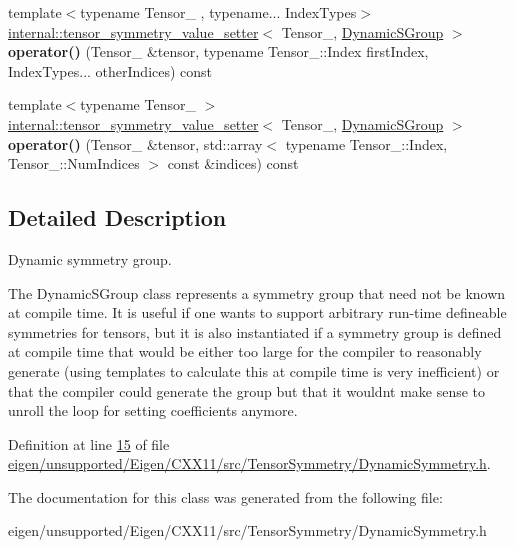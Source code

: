 \begin{DoxyCompactItemize}
\mbox{\label{class_eigen_1_1_dynamic_s_group_a0d1f3c6ef73e3661a568ce888b6cca58}} 
{\footnotesize template$<$typename Tensor\+\_\+ , typename... Index\+Types$>$ }\\\hyperlink{class_eigen_1_1internal_1_1tensor__symmetry__value__setter}{internal\+::tensor\+\_\+symmetry\+\_\+value\+\_\+setter}$<$ Tensor\+\_\+, \hyperlink{class_eigen_1_1_dynamic_s_group}{Dynamic\+S\+Group} $>$ {\bfseries operator()} (Tensor\+\_\+ \&tensor, typename Tensor\+\_\+\+::\+Index first\+Index, Index\+Types... other\+Indices) const
\item 
\mbox{\label{class_eigen_1_1_dynamic_s_group_a22aed98eb89f2775943663efec999ae6}} 
{\footnotesize template$<$typename Tensor\+\_\+ $>$ }\\\hyperlink{class_eigen_1_1internal_1_1tensor__symmetry__value__setter}{internal\+::tensor\+\_\+symmetry\+\_\+value\+\_\+setter}$<$ Tensor\+\_\+, \hyperlink{class_eigen_1_1_dynamic_s_group}{Dynamic\+S\+Group} $>$ {\bfseries operator()} (Tensor\+\_\+ \&tensor, std\+::array$<$ typename Tensor\+\_\+\+::\+Index, Tensor\+\_\+\+::\+Num\+Indices $>$ const \&indices) const
\end{DoxyCompactItemize}


\subsection{Detailed Description}
Dynamic symmetry group. 

The Dynamic\+S\+Group class represents a symmetry group that need not be known at compile time. It is useful if one wants to support arbitrary run-\/time defineable symmetries for tensors, but it is also instantiated if a symmetry group is defined at compile time that would be either too large for the compiler to reasonably generate (using templates to calculate this at compile time is very inefficient) or that the compiler could generate the group but that it wouldn\textquotesingle{}t make sense to unroll the loop for setting coefficients anymore. 

Definition at line \hyperlink{eigen_2unsupported_2_eigen_2_c_x_x11_2src_2_tensor_symmetry_2_dynamic_symmetry_8h_source_l00015}{15} of file \hyperlink{eigen_2unsupported_2_eigen_2_c_x_x11_2src_2_tensor_symmetry_2_dynamic_symmetry_8h_source}{eigen/unsupported/\+Eigen/\+C\+X\+X11/src/\+Tensor\+Symmetry/\+Dynamic\+Symmetry.\+h}.



The documentation for this class was generated from the following file\+:\begin{DoxyCompactItemize}
\item 
eigen/unsupported/\+Eigen/\+C\+X\+X11/src/\+Tensor\+Symmetry/\+Dynamic\+Symmetry.\+h\end{DoxyCompactItemize}

